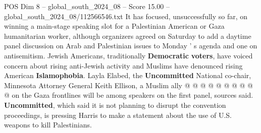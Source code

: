 \begin{textsample}{POS Dim 8 – global\_south\_2024\_08 – Score 15.00 – global\_south\_2024\_08/112566546.txt}
It has focused, unsuccessfully so far, on winning a main-stage speaking slot for a Palestinian American or Gaza humanitarian worker, although organizers agreed on Saturday to add a daytime panel discussion on Arab and Palestinian issues to Monday ' s agenda and one on antisemitism.
Jewish Americans, traditionally \textbf{Democratic} \textbf{voters}, have voiced concern about rising anti-Jewish activity and Muslims have denounced rising American \textbf{Islamophobia}.
Layla Elabed, the \textbf{Uncommitted} National co-chair, Minnesota Attorney General Keith Ellison, a Muslim ally @ @ @ @ @ @ @ @ @ @ on the Gaza frontlines will be among speakers on the first panel, sources said. \textbf{Uncommitted}, which said it is not planning to disrupt the convention proceedings, is pressing Harris to make a statement about the use of U.S. weapons to kill Palestinians.

\end{textsample}
